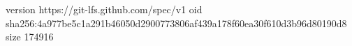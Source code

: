 version https://git-lfs.github.com/spec/v1
oid sha256:4a977be5c1a291b46050d2900773806af439a178f60ea30f610d3b96d80190d8
size 174916
